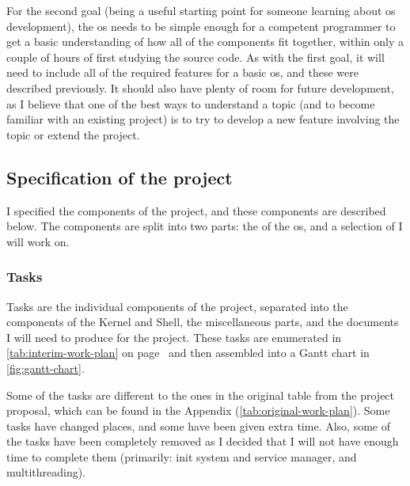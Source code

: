 \documentclass{article}
\begin{document}
For the second goal (being a useful starting point for someone learning about
\gls{os} development), the \gls{os} needs to be simple enough for a competent
programmer to get a basic understanding of how all of the components fit
together, within only a couple of hours of first studying the source code. As
with the first goal, it will need to include all of the required features for a
basic \gls{os}, and these were described previously. It should also have plenty
of room for future development, as I believe that one of the best ways to
understand a topic (and to become familiar with an existing project) is to try
to develop a new feature involving the topic or extend the project.


\subsection{Specification of the project}
I specified the components of the project, and these components are described
below. The components are split into two parts: the  of the
\gls{os}, and a selection of  I will work on.

\subsubsection{Tasks}
\label{sec:tasks}
Tasks are the individual components of the project, separated into the
components of the Kernel and Shell, the miscellaneous parts, and the documents
I will need to produce for the project. These tasks are enumerated in
\autoref{tab:interim-work-plan} on page~\pageref*{tab:interim-work-plan} and
then assembled into a Gantt chart in \autoref{fig:gantt-chart}.

Some of the tasks are different to the ones in the original table from the
project proposal, which can be found in the Appendix
(\autoref{tab:original-work-plan}). Some tasks have changed places, and some
have been given extra time. Also, some of the tasks have been completely
removed as I decided that I will not have enough time to complete them
(primarily: init system and service manager, and multithreading).
\end{document}
